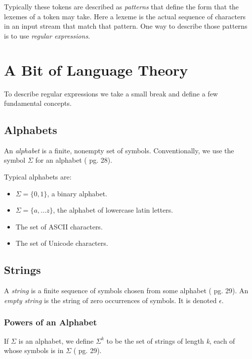 \documentclass[a4paper,oneside,11pt]{book}
\theoremstyle{definition}
\begin{document}
Typically these tokens are described as \emph{patterns} that define the form
that the lexemes of a token may take. Here a lexeme is the actual sequence of
characters in an input stream that match that pattern.
One way to describe those patterns is to use \emph{regular expressions}.

\section{A Bit of Language Theory}

To describe regular expressions we take a small break and define a few fundamental concepts.

\subsection{Alphabets}

An \emph{alphabet} is a finite, nonempty set of symbols.
Conventionally, we use the symbol $\Sigma$ for an alphabet (\cite{AUTOMATA} pg. 28).

Typical alphabets are:
\begin{itemize}
\item
$\Sigma = \{0, 1\}$, a binary alphabet.

\item
$\Sigma = \{a, \ldots z\}$, the alphabet of lowercase latin letters.

\item
The set of ASCII characters.

\item
The set of Unicode characters.
\end{itemize}

\subsection{Strings}

A \emph{string} is a finite sequence of symbols chosen from some alphabet (\cite{AUTOMATA} pg. 29).
An \emph{empty string} is the string of zero occurrences of symbols. It is denoted $\epsilon$.

\subsubsection{Powers of an Alphabet}

If $\Sigma$ is an alphabet, we define $\Sigma^k$ to be the set of strings of length \emph{k}, each of whose
symbols is in $\Sigma$ (\cite{AUTOMATA} pg. 29).
\end{document}
